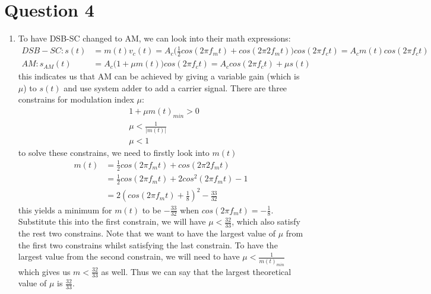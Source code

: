 \documentclass[11pt]{article}
\begin{document}

\section*{Question 4}
\begin{enumerate}[label=(\alph*)]
\item %
To have DSB-SC changed to AM, we can look into their math expressions: 
\begin{align*}
DSB-SC: s(t)&=m(t)v_c(t)= A_c\biggr( \frac{1}{2} cos(2 \pi f_m t)+cos(2\pi 2 f_m t)\biggr ) cos(2\pi f_c t) =A_c m(t)cos(2\pi f_c t)\\
AM: s_{AM}(t)&= A_c \biggr(1+\mu m(t) \biggr)cos(2\pi f_c t) = A_c cos(2\pi f_c t)+\mu s(t)
\end{align*}
this indicates us that AM can be achieved by giving a variable gain (which is $\mu$) to $s(t)$ and use system adder to add a carrier signal. There are three constrains for modulation index $\mu$:
\begin{align*}
 & 1+\mu m(t)_{min}>0\\
 & \mu<\frac{1}{|m(t)|}\\
 & \mu<1
\end{align*}
to solve these constrains, we need to firstly look into $m(t)$
\begin{align*}
 m(t)&=\frac{1}{2} cos(2 \pi f_m t)+cos(2\pi 2 f_m t) \\
 &= \frac{1}{2} cos(2 \pi f_m t)+2cos^2(2\pi f_m t)-1\\
 &=2(cos(2\pi f_m t)+\frac{1}{8})^2-\frac{33}{32}
\end{align*}
this yields a minimum for $m(t)$ to be $-\frac{33}{32}$ when $cos(2\pi f_m t)=-\frac{1}{8}$. Substitute this into the first constrain, we will have $\mu<\frac{32}{33}$, which also satisfy the rest two constrains. Note that we want to have the largest value of $\mu$ from the first two constrains whilst satisfying the last constrain. To have the largest value from the second constrain, we will need to have $\mu<\frac{1}{m(t)_{min}}$ which gives us $m<\frac{32}{33}$ as well. Thus we can say that the largest theoretical value of $\mu$ is $\frac{32}{33}$.


\end{enumerate}
\end{document}
